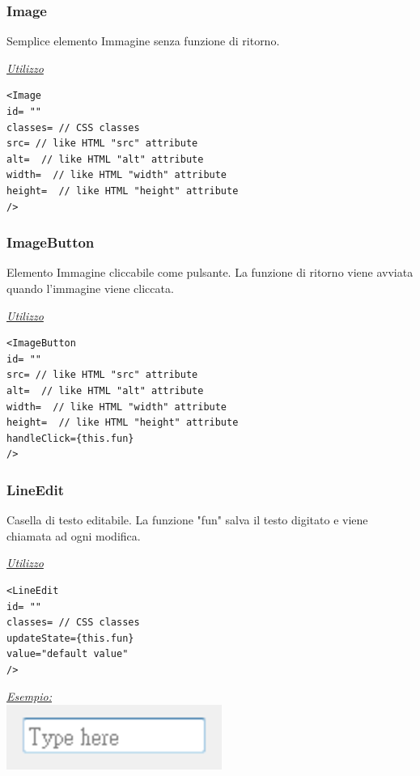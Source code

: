 \subsubsection{Image}
Semplice elemento Immagine senza funzione di ritorno.
\begin{center}
\underline{\textit{Utilizzo}}
\begin{lstlisting}
<Image
id= ""
classes= // CSS classes
src= // like HTML "src" attribute
alt=  // like HTML "alt" attribute
width=  // like HTML "width" attribute
height=  // like HTML "height" attribute
/>
\end{lstlisting}
\end{center}

\subsubsection{ImageButton}
Elemento Immagine cliccabile come pulsante. La funzione di ritorno viene avviata quando l'immagine viene cliccata.
\begin{center}
\underline{\textit{Utilizzo}}
\begin{lstlisting}
<ImageButton
id= ""
src= // like HTML "src" attribute
alt=  // like HTML "alt" attribute
width=  // like HTML "width" attribute
height=  // like HTML "height" attribute
handleClick={this.fun}
/>
\end{lstlisting}
\end{center}


\subsubsection{LineEdit}
Casella di testo editabile. La funzione "fun" salva il testo digitato e viene chiamata ad ogni modifica.
\begin{center}
\underline{\textit{Utilizzo}}
\begin{lstlisting}
<LineEdit
id= ""
classes= // CSS classes
updateState={this.fun}
value="default value"
/>
\end{lstlisting}
\underline{\textit{Esempio:}}
\\
\includegraphics[scale=1]{img/lineedit.png}
\\
\end{center}

